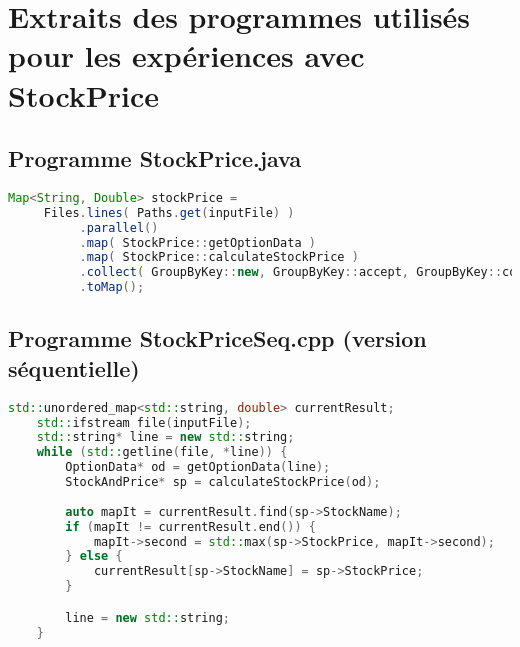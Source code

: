 \chapter{Extraits des programmes utilisés pour les expériences avec {StockPrice}}
\label{appendice-code-stockprice.ann}

\section{Programme {StockPrice.java}}

\begin{lstlisting}[gobble=3,basicstyle=\ttfamily\footnotesize,language=java]
   Map<String, Double> stockPrice =
     Files.lines( Paths.get(inputFile) )
          .parallel()
          .map( StockPrice::getOptionData )
          .map( StockPrice::calculateStockPrice )
          .collect( GroupByKey::new, GroupByKey::accept, GroupByKey::combine )
          .toMap();
\end{lstlisting}

\newpage
\section{Programme {StockPriceSeq.cpp} (version séquentielle)}
\begin{lstlisting}[gobble=4,basicstyle=\ttfamily\footnotesize,language=c++]
    std::unordered_map<std::string, double> currentResult;
    std::ifstream file(inputFile);
    std::string* line = new std::string;
    while (std::getline(file, *line)) {
        OptionData* od = getOptionData(line);
        StockAndPrice* sp = calculateStockPrice(od);
        
        auto mapIt = currentResult.find(sp->StockName);
        if (mapIt != currentResult.end()) {
            mapIt->second = std::max(sp->StockPrice, mapIt->second);
        } else {
            currentResult[sp->StockName] = sp->StockPrice;
        }

        line = new std::string;
    }
\end{lstlisting}

\newpage

